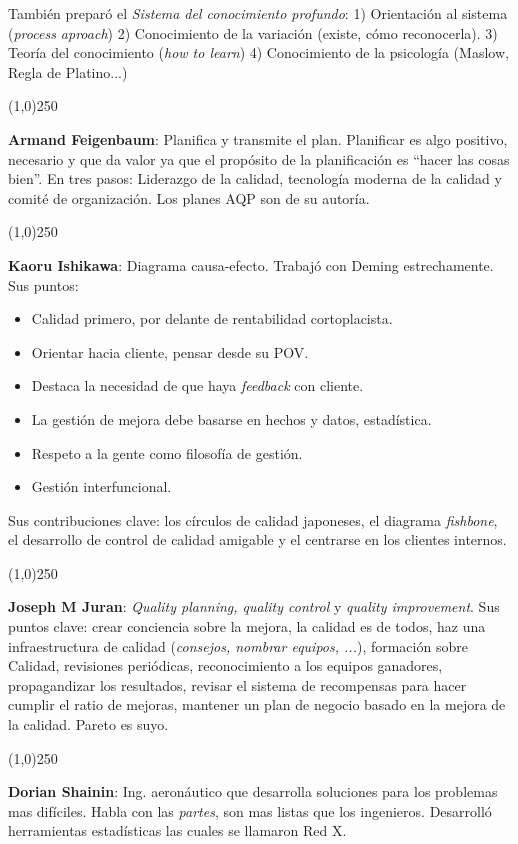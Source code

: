 \documentclass[oneside]{book}
\begin{document}
También preparó el \textit{Sistema del conocimiento profundo}: 1) Orientación al sistema (\textit{process aproach}) 2) Conocimiento de la variación (existe, cómo reconocerla). 3) Teoría del conocimiento (\textit{how to learn}) 4) Conocimiento de la psicología (Maslow, Regla de Platino...) 
\begin{center}
	\line(1,0){250}
\end{center}
\textbf{Armand Feigenbaum}: Planifica y transmite el plan. Planificar es algo positivo, necesario y que da valor ya que el propósito de la planificación es ``hacer las cosas bien''. En tres pasos: Liderazgo de la calidad, tecnología moderna de la calidad y comité de organización. Los planes AQP son de su autoría. 
\begin{center}
	\line(1,0){250}
\end{center}
\textbf{Kaoru Ishikawa}: Diagrama causa-efecto. Trabajó con Deming estrechamente. Sus puntos: \begin{itemize} \item Calidad primero, por delante de rentabilidad cortoplacista. \item Orientar hacia cliente, pensar desde su POV. \item Destaca la necesidad de que haya \textit{feedback} con cliente. \item La gestión de mejora debe basarse en hechos y datos, estadística. \item  Respeto a la gente como filosofía de gestión. \item Gestión interfuncional. \end{itemize} Sus contribuciones clave: los círculos de calidad japoneses, el diagrama \textit{fishbone}, el desarrollo de control de calidad amigable y el centrarse en los clientes internos.
\begin{center}
	\line(1,0){250}
\end{center}
\textbf{Joseph M Juran}: \textit{Quality planning, quality control} y \textit{quality improvement}. Sus puntos clave: crear conciencia sobre la mejora, la calidad es de todos, haz una infraestructura de calidad (\textit{consejos, nombrar equipos, ...}), formación sobre Calidad, revisiones periódicas, reconocimiento a los equipos ganadores, propagandizar los resultados, revisar el sistema de recompensas para hacer cumplir el ratio de mejoras, mantener un plan de negocio basado en la mejora de la calidad. Pareto es suyo. 
\begin{center}
	\line(1,0){250}
\end{center}
\textbf{Dorian Shainin}: Ing. aeronáutico que desarrolla soluciones para los problemas mas difíciles. Habla con las \textit{partes}, son mas listas que los ingenieros. Desarrolló herramientas estadísticas las cuales se llamaron Red X.
\end{document}
